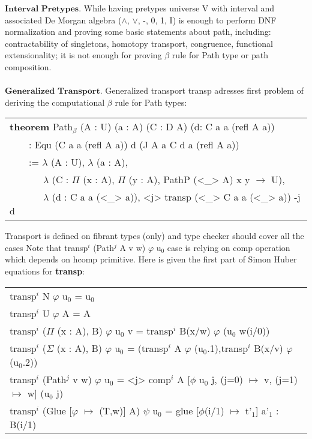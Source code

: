 \documentclass[a4paper,UKenglish,cleveref, autoref, thm-restate]{lipics-v2021}
\newcommand{\tabstyle}[0]{\scriptsize\ttfamily\fontseries{l}\selectfont}
\begin{document}
$\textbf{Interval\ Pretypes}$. While having pretypes universe V with interval and
associated De Morgan algebra ($\wedge$, $\vee$, -, 0, 1, I) is enough to
perform DNF normalization and proving some basic statements about path, including:
contractability of singletons, homotopy transport, congruence, functional
extensionality; it is not enough for proving $\beta$ rule for Path type or path composition.
\\
\\
\indent $\textbf{Generalized\ Transport}$. Generalized transport transp adresses
first problem of deriving the computational $\beta$ rule for Path types:

\begin{table}[ht]
\tabstyle
\begin{tabular}{l}
\textbf{theorem} Path$_\beta$ (A : U) (a : A) (C : D A) (d: C a a (refl A a)) \\
\ \ \ \ : Equ (C a a (refl A a)) d (J A a C d a (refl A a)) \\
\ \ \ \ := $\lambda$ (A : U), $\lambda$ (a : A), \\
\ \ \ \ \ \ \ $\lambda$ (C : $\Pi$ (x : A), $\Pi$ (y : A), PathP (<\_> A) x y $\rightarrow$ U), \\
\ \ \ \ \ \ \ $\lambda$ (d : C a a (<\_> a)), <j> transp (<\_> C a a (<\_> a)) -j d \\
\end{tabular}
\end{table}

Transport is defined on fibrant types (only) and type checker should cover all the cases
Note that transp$^i$ (Path$^j$ A v w) $\varphi$ u$_0$ case is relying on comp
operation which depends on hcomp primitive. Here is given the first part of Simon Huber equations \cite{Huber} for \textbf{transp}:

\begin{table}[ht]
\tabstyle
\begin{tabular}{l}
transp$^{i}$ N $\varphi$ u$_0$ = u$_0$ \\
transp$^{i}$ U $\varphi$ A = A \\
transp$^{i}$ ($\Pi$ (x : A), B) $\varphi$ u$_0$ v = transp$^i$ B(x/w) $\varphi$ (u$_0$ w(i/0)) \\
transp$^{i}$ ($\Sigma$ (x : A), B) $\varphi$ u$_0$ = (transp$^i$ A $\varphi$ (u$_0$.1),transp$^i$ B(x/v) $\varphi$ (u$_0$.2)) \\
transp$^{i}$ (Path$^j$ v w) $\varphi$ u$_0$ = <j> comp$^i$ A [$\phi$ u$_0$ j, (j=0) $\mapsto$ v, (j=1) $\mapsto$ w] (u$_0$ j) \\
transp$^{i}$ (Glue [$\varphi$ $\mapsto$ (T,w)] A) $\psi$ u$_0$ = glue [$\phi$(i/1) $\mapsto$ t'$_1$] a'$_1$ : B(i/1) \\
\end{tabular}
\end{table}
\end{document}
